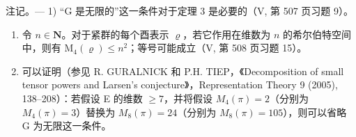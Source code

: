 注记。--- 1) “G 是无限的”这一条件对于定理 3 是必要的（V, 第 507 页习题 9）。

\begin{enumerate}
\def\labelenumi{\arabic{enumi})}
\setcounter{enumi}{1}
\item
  令 \(n \in \mathbf{N}\)。对于紧群的每个酉表示 \(\varrho\)，若它作用在维数为 \(n\) 的希尔伯特空间中，则有 \(\mathrm{M}_{4}(\varrho) \leqslant n^{2}\)；等号可能成立（V, 第 508 页习题 15）。
\item
  可以证明（参见 R. GURALNICK 和 P.H. TIEP，《Decomposition of small tensor powers and Larsen's conjecture》，Representation Theory 9 (2005), 138--208）：若假设 E 的维数 \(\geqslant 7\)，并将假设 \(M_{4}(\pi) = 2\)（分别为 \(M_{4}(\pi) = 3\)）替换为 \(M_{8}(\pi) = 24\)（分别为 \(M_{8}(\pi) = 105\)），则可以省略 G 为无限这一条件。
\end{enumerate}

